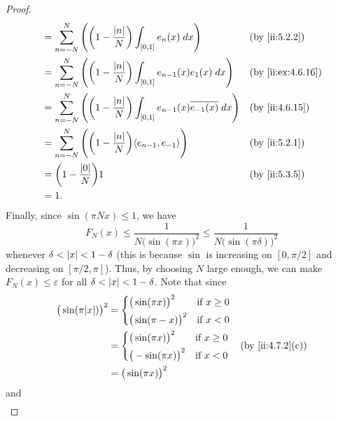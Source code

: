 \begin{proof}
\begin{align*}
     & = \sum_{n = -N}^N \Bigg(\bigg(1 - \dfrac{\abs{n}}{N}\bigg) \int_{[0, 1]} e_n(x) \; dx\Bigg)                            &  & \by{ii:5.2.2}     \\
     & = \sum_{n = -N}^N \Bigg(\bigg(1 - \dfrac{\abs{n}}{N}\bigg) \int_{[0, 1]} e_{n - 1}(x) e_1(x) \; dx\Bigg)               &  & \by{ii:ex:4.6.16} \\
     & = \sum_{n = -N}^N \Bigg(\bigg(1 - \dfrac{\abs{n}}{N}\bigg) \int_{[0, 1]} e_{n - 1}(x) \overline{e_{-1}(x)} \; dx\Bigg) &  & \by{ii:4.6.15}    \\
     & = \sum_{n = -N}^N \Bigg(\bigg(1 - \dfrac{\abs{n}}{N}\bigg) \inner*{e_{n - 1}, e_{-1}}\Bigg)                            &  & \by{ii:5.2.1}     \\
     & = \bigg(1 - \dfrac{\abs{0}}{N}\bigg) 1                                                                                 &  & \by{ii:5.3.5}     \\
     & = 1.
  \end{align*}
  Finally, since \(\sin(\pi N x) \leq 1\), we have
  \[
    F_N(x) \leq \dfrac{1}{N \big(\sin(\pi x)\big)^2} \leq \dfrac{1}{N \big(\sin(\pi \delta)\big)^2}
  \]
  whenever \(\delta < \left\lvert x\right\rvert < 1 - \delta\)
  (this is because \(\sin\) is increasing on \([0, \pi / 2]\) and decreasing on \([\pi / 2, \pi]\)).
  Thus, by choosing \(N\) large enough, we can make \(F_N (x) \leq \varepsilon\) for all \(\delta < \left\lvert x\right\rvert < 1 - \delta\).
  Note that since
  \begin{align*}
    \big(\sin(\pi \abs{x})\big)^2 & = \begin{dcases}
                                        \big(\sin(\pi x)\big)^2  & \text{if } x \geq 0 \\
                                        \big(\sin(\pi -x)\big)^2 & \text{if } x < 0
                                      \end{dcases} \\
                                  & = \begin{dcases}
                                        \big(\sin(\pi x)\big)^2  & \text{if } x \geq 0 \\
                                        \big(-\sin(\pi x)\big)^2 & \text{if } x < 0
                                      \end{dcases} &  & \by{ii:4.7.2}[c] \\
                                  & = \big(\sin(\pi x)\big)^2
  \end{align*}
  and
  \begin{align*}

\end{align*}
\end{proof}
